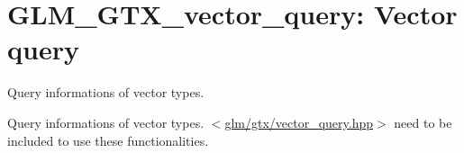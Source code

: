 \hypertarget{group__gtx__vector__query}{\section{\-G\-L\-M\-\_\-\-G\-T\-X\-\_\-vector\-\_\-query\-: \-Vector query}
\label{group__gtx__vector__query}
}


\-Query informations of vector types.  


\-Query informations of vector types. $<$\hyperlink{vector__query_8hpp}{glm/gtx/vector\-\_\-query.\-hpp}$>$ need to be included to use these functionalities. 